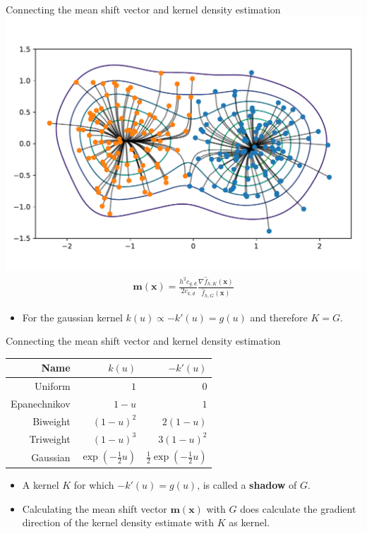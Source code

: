 \documentclass[18pt]{beamer}
\begin{document}
\begin{frame}{Connecting the mean shift vector and kernel density estimation}
\centering
\includegraphics[height=0.4\textheight]{figures/contour}
	\begin{align*}
		\bm{m}(\bm{x}) = \frac{h^2c_{g,d}}{2c_{k,d}} \frac{\nabla \hat{f}_{h,K}(\bm{x})}{\hat{f}_{h,G}(\bm{x})}
	\end{align*}
	\begin{itemize}
		\item For the gaussian kernel $k(u) \propto -k'(u) = g(u)$ and therefore $K = G$.
	\end{itemize}
\end{frame}

\begin{frame}{Connecting the mean shift vector and kernel density estimation}
\begin{table}
	\begin{center}
		\begin{tabular}{r|r|r}
			\textbf{Name} & $k(u)$ & $-k'(u)$ \\ \hline\hline
			Uniform & $1$ & $0$ \\
			Epanechnikov & $1 - u$ & $1$ \\
			Biweight & $(1 - u)^2$ & $2 (1 - u)$ \\
			Triweight & $(1 - u)^3$ & $3 (1 - u)^2$  \\
			Gaussian & $\exp\left(-\frac{1}{2}u\right)$ & $\frac{1}{2}\exp\left(-\frac{1}{2}u\right)$
		\end{tabular}
	\end{center}
	\vspace*{10mm}
	\begin{itemize}
		\item A kernel $K$ for which $-k'(u) = g(u)$, is called a \textbf{shadow} of $G$.
		\item Calculating the mean shift vector $\bm{m}(\bm{x})$ with $G$ does calculate the gradient direction of the kernel density estimate with $K$ as kernel.
	\end{itemize}
\end{table}
\end{frame}
\end{document}
